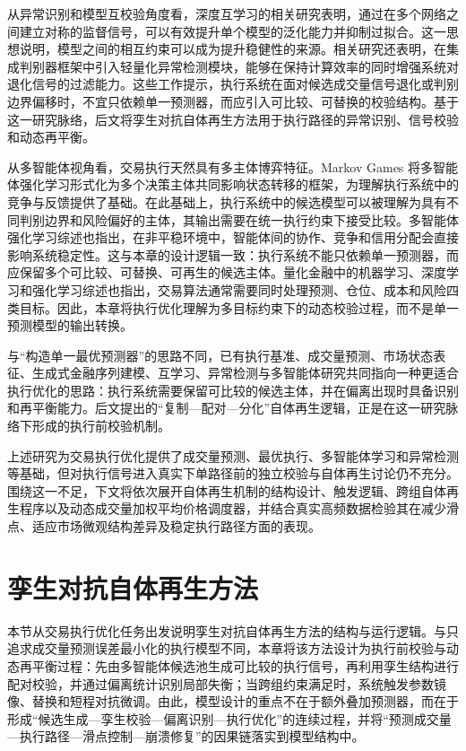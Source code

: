 从异常识别和模型互校验角度看，深度互学习的相关研究表明，通过在多个网络之间建立对称的监督信号，可以有效提升单个模型的泛化能力并抑制过拟合\cite{zhang2018dml}。这一思想说明，模型之间的相互约束可以成为提升稳健性的来源。相关研究还表明，在集成判别器框架中引入轻量化异常检测模块，能够在保持计算效率的同时增强系统对退化信号的过滤能力\cite{xie2022lightweight}。这些工作提示，执行系统在面对候选成交量信号退化或判别边界偏移时，不宜只依赖单一预测器，而应引入可比较、可替换的校验结构。基于这一研究脉络，后文将孪生对抗自体再生方法用于执行路径的异常识别、信号校验和动态再平衡。

从多智能体视角看，交易执行天然具有多主体博弈特征。Markov Games 将多智能体强化学习形式化为多个决策主体共同影响状态转移的框架，为理解执行系统中的竞争与反馈提供了基础\cite{littman1994markov}。在此基础上，执行系统中的候选模型可以被理解为具有不同判别边界和风险偏好的主体，其输出需要在统一执行约束下接受比较。多智能体强化学习综述也指出，在非平稳环境中，智能体间的协作、竞争和信用分配会直接影响系统稳定性\cite{busoniu2008comprehensive}。这与本章的设计逻辑一致：执行系统不能只依赖单一预测器，而应保留多个可比较、可替换、可再生的候选主体。量化金融中的机器学习、深度学习和强化学习综述也指出，交易算法通常需要同时处理预测、仓位、成本和风险四类目标\cite{sahu2023overview}。因此，本章将执行优化理解为多目标约束下的动态校验过程，而不是单一预测模型的输出转换。

与“构造单一最优预测器”的思路不同，已有执行基准、成交量预测、市场状态表征、生成式金融序列建模、互学习、异常检测与多智能体研究共同指向一种更适合执行优化的思路：执行系统需要保留可比较的候选主体，并在偏离出现时具备识别和再平衡能力。后文提出的“复制—配对—分化”自体再生逻辑，正是在这一研究脉络下形成的执行前校验机制。

上述研究为交易执行优化提供了成交量预测、最优执行、多智能体学习和异常检测等基础，但对执行信号进入真实下单路径前的独立校验与自体再生讨论仍不充分。围绕这一不足，下文将依次展开自体再生机制的结构设计、触发逻辑、跨组自体再生程序以及动态成交量加权平均价格调度器，并结合真实高频数据检验其在减少滑点、适应市场微观结构差异及稳定执行路径方面的表现。

\section{孪生对抗自体再生方法}

本节从交易执行优化任务出发说明孪生对抗自体再生方法的结构与运行逻辑。与只追求成交量预测误差最小化的执行模型不同，本章将该方法设计为执行前校验与动态再平衡过程：先由多智能体候选池生成可比较的执行信号，再利用孪生结构进行配对校验，并通过偏离统计识别局部失衡；当跨组约束满足时，系统触发参数镜像、替换和短程对抗微调。由此，模型设计的重点不在于额外叠加预测器，而在于形成“候选生成—孪生校验—偏离识别—执行优化”的连续过程，并将“预测成交量—执行路径—滑点控制—崩溃修复”的因果链落实到模型结构中。

